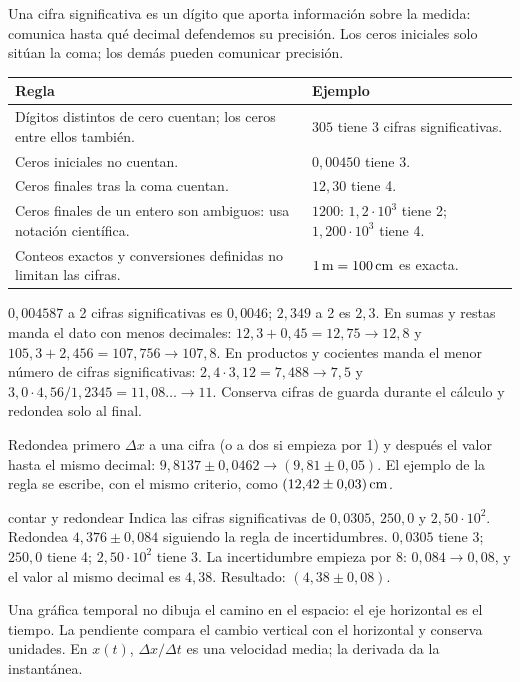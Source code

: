 \documentclass[11pt,a4paper]{article}
\begin{document}
Una cifra significativa es un d\'igito que aporta informaci\'on sobre la medida:
comunica hasta qu\'e decimal defendemos su precisi\'on. Los ceros iniciales solo
sit\'uan la coma; los dem\'as pueden comunicar precisi\'on.
\begin{tabularx}{\linewidth}{@{}p{5.2cm}Y@{}}
\toprule
Regla & Ejemplo\\
\midrule
D\'igitos distintos de cero cuentan; los ceros entre ellos tambi\'en. &
$305$ tiene 3 cifras significativas.\\
Ceros iniciales no cuentan. & $0{,}00450$ tiene 3.\\
Ceros finales tras la coma cuentan. & $12{,}30$ tiene 4.\\
Ceros finales de un entero son ambiguos: usa notaci\'on cient\'ifica. &
$1200$: $1{,}2\cdot10^3$ tiene 2; $1{,}200\cdot10^3$ tiene 4.\\
Conteos exactos y conversiones definidas no limitan las cifras. &
$1\,\mathrm{m}=100\,\mathrm{cm}$ es exacta.\\
\bottomrule
\end{tabularx}

$0{,}004587$ a 2 cifras significativas es $0{,}0046$; $2{,}349$ a 2 es $2{,}3$.
En sumas y restas manda el dato con menos decimales:
$12{,}3+0{,}45=12{,}75\to12{,}8$ y
$105{,}3+2{,}456=107{,}756\to107{,}8$. En productos y cocientes manda el menor
n\'umero de cifras significativas:
$2{,}4\cdot3{,}12=7{,}488\to7{,}5$ y
$3{,}0\cdot4{,}56/1{,}2345=11{,}08\ldots\to11$.
Conserva cifras de guarda durante el c\'alculo y redondea solo al final.

Redondea primero $\Delta x$ a una cifra (o a dos si empieza por 1) y despu\'es
el valor hasta el mismo decimal:
$9{,}8137\pm0{,}0462\to(9{,}81\pm0{,}05)$. El ejemplo de la regla se escribe,
con el mismo criterio, como $(12{,}42\pm0{,}03)\,\mathrm{cm}$.

\begin{exercisebox}{contar y redondear}
Indica las cifras significativas de $0{,}0305$, $250{,}0$ y $2{,}50\cdot10^2$.
Redondea $4{,}376\pm0{,}084$ siguiendo la regla de incertidumbres.
\solutionblock
$0{,}0305$ tiene 3; $250{,}0$ tiene 4; $2{,}50\cdot10^2$ tiene 3.
La incertidumbre empieza por 8: $0{,}084\to0{,}08$, y el valor al mismo decimal es
$4{,}38$. Resultado: $(4{,}38\pm0{,}08)$.
\end{exercisebox}

Una gr\'afica temporal no dibuja el camino en el espacio: el eje horizontal es el
tiempo. La pendiente compara el cambio vertical con el horizontal y conserva unidades.
En $x(t)$, $\Delta x/\Delta t$ es una velocidad media; la derivada da la instant\'anea.
\end{document}

